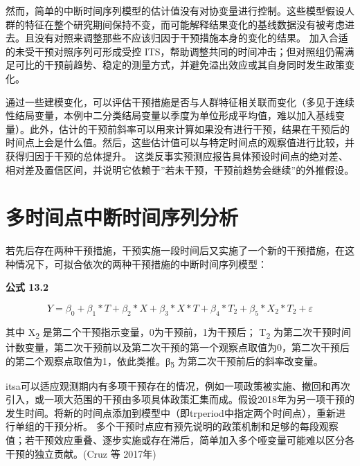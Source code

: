 \documentclass[
  chinese-hans,
  letterpaper,
  DIV=11,
  numbers=noendperiod]{scrreprt}
\begin{document}
\begin{tcolorbox}[enhanced jigsaw, arc=.35mm, bottomrule=.15mm, breakable, colback=white, colframe=quarto-callout-note-color-frame, left=2mm, leftrule=.75mm, opacityback=0, rightrule=.15mm, toprule=.15mm]
\end{tcolorbox}

然而，简单的中断时间序列模型的估计值没有对协变量进行控制。这些模型假设人群的特征在整个研究期间保持不变，而可能解释结果变化的基线数据没有被考虑进去。且没有对照来调整那些不应该归因于干预措施本身的变化的结果。
加入合适的未受干预对照序列可形成受控
ITS，帮助调整共同的时间冲击；但对照组仍需满足可比的干预前趋势、稳定的测量方式，并避免溢出效应或其自身同时发生政策变化。

通过一些建模变化，可以评估干预措施是否与人群特征相关联而变化（多见于连续性结局变量，本例中二分类结局变量以季度为单位形成平均值，难以加入基线变量）。此外，估计的干预前斜率可以用来计算如果没有进行干预，结果在干预后的时间点上会是什么值。然后，这些估计值可以与特定时间点的观察值进行比较，并获得归因于干预的总体提升。
这类反事实预测应报告具体预设时间点的绝对差、相对差及置信区间，并说明它依赖于''若未干预，干预前趋势会继续''的外推假设。

\section{多时间点中断时间序列分析}\label{ux591aux65f6ux95f4ux70b9ux4e2dux65adux65f6ux95f4ux5e8fux5217ux5206ux6790}

若先后存在两种干预措施，干预实施一段时间后又实施了一个新的干预措施，在这种情况下，可拟合依次的两种干预措施的中断时间序列模型：

\textbf{公式 13.2}

\[Y = \beta_{0} + \beta_{1}*T + \beta_{2}*X + \beta_{3}*X*T + \beta_{4}*T_{2} + \beta_{5}*X_{2}*T_{2} + \varepsilon\]

其中 X\textsubscript{2} 是第二个干预指示变量，0为干预前，1为干预后；
T\textsubscript{2}
为第二次干预时间计数变量，第二次干预前以及第二次干预的第一个观察点取值为0，第二次干预后的第二个观察点取值为1，依此类推。β\textsubscript{5}
为第二次干预前后的斜率改变量。

itsa可以适应观测期内有多项干预存在的情况，例如一项政策被实施、撤回和再次引入，或一项大范围的干预由多项具体政策汇集而成。假设2018年为另一项干预的发生时间。将新的时间点添加到模型中（即trperiod中指定两个时间点），重新进行单组的干预分析。
多个干预时点应有预先说明的政策机制和足够的每段观察值；若干预效应重叠、逐步实施或存在滞后，简单加入多个哑变量可能难以区分各干预的独立贡献。(Cruz
等 2017年)
\end{document}
